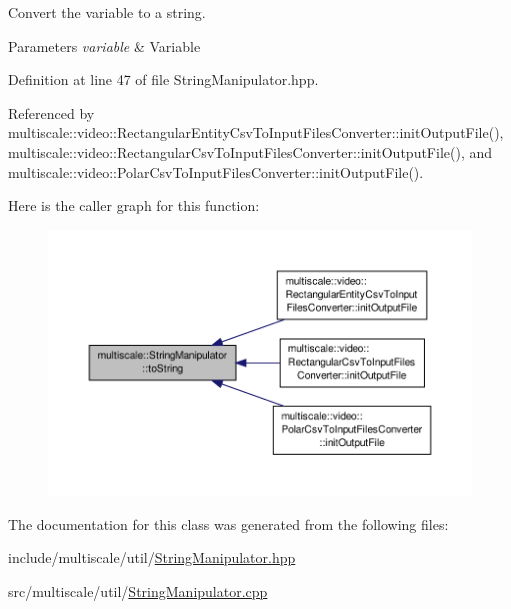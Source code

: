 Convert the variable to a string. 


\begin{DoxyParams}{Parameters}
{\em variable} & Variable \\
\hline
\end{DoxyParams}


Definition at line 47 of file String\-Manipulator.\-hpp.



Referenced by multiscale\-::video\-::\-Rectangular\-Entity\-Csv\-To\-Input\-Files\-Converter\-::init\-Output\-File(), multiscale\-::video\-::\-Rectangular\-Csv\-To\-Input\-Files\-Converter\-::init\-Output\-File(), and multiscale\-::video\-::\-Polar\-Csv\-To\-Input\-Files\-Converter\-::init\-Output\-File().



Here is the caller graph for this function\-:\nopagebreak
\begin{figure}[H]
\begin{center}
\leavevmode
\includegraphics[width=350pt]{classmultiscale_1_1StringManipulator_a91858c4faa5ee210a9b67e4885835368_icgraph}
\end{center}
\end{figure}




The documentation for this class was generated from the following files\-:\begin{DoxyCompactItemize}
\item 
include/multiscale/util/\hyperlink{StringManipulator_8hpp}{String\-Manipulator.\-hpp}\item 
src/multiscale/util/\hyperlink{StringManipulator_8cpp}{String\-Manipulator.\-cpp}\end{DoxyCompactItemize}
